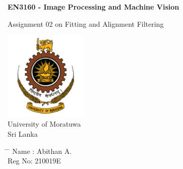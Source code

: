 \documentclass[12pt,a4paper]{article}
\title{}
\author{}
\date{}
\begin{document}
	
\newcommand{\subf}[2]{%
    {\small\begin{tabular}[t]{@{}c@{}}
            #1\\#1
    \end{tabular}}%
}

\begin{titlepage}
    \begin{center}
        \vspace{1cm}		
        \Huge
        \textbf{EN3160 - Image Processing and Machine Vision}

        \vspace{0.5cm}
        {\LARGE Assignment 02 on Fitting and Alignment
Filtering}
        \vspace{1cm}
        \large			
        \vspace{0.5cm}
        \LARGE			
        \vspace{3cm}
        
        \textbf{}
        \includegraphics[width=0.3\textwidth]{university.png}\\
        {\Large University of Moratuwa}
        \\
        {\Large Sri Lanka}
        \vfill			
        \vspace{0.4cm}
        \Large
    \end{center}
    
    \Large
    \vspace{1cm}
    \begin{tabbing}
        \hspace*{11em}\= \hspace*{4em} \= \kill %
        \> Name\> :  Abithan A.\\
        \> Reg No\>:  210019E \\
    \end{tabbing}
    

\end{titlepage}
\end{document}
